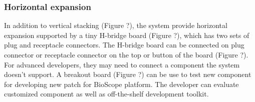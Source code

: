 \vspace{10pt}
\subsubsection{Horizontal expansion}
In addition to vertical stacking (Figure ?), the system provide horizontal expansion supported by a tiny H-bridge board (Figure ?), which has two sets of plug and receptacle connectors. The H-bridge board can be connected on plug connector or receptacle connector on the top or button of the board (Figure ?). For advanced developers, they may need to connect a component the system doesn't support. A breakout board (Figure ?) can be use to test new component for developing new patch for BioScope platform. The developer can evaluate customized component as well as off-the-shelf development toolkit.

